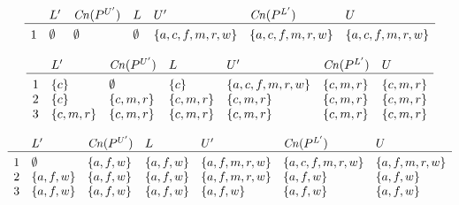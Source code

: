 \documentclass{article}
\begin{document}
\[
\begin{array}{c@{\hspace{10pt}}llllll}
& L' & \mathit{Cn}(P^{U'}) & L
& U' & \mathit{Cn}(P^{L'}) & U \\\hline\\[-3mm]
1 & \emptyset & \emptyset & \emptyset & \{a,c,f,m,r,w\} & \{a,c,f,m,r,w\} & \{a,c,f,m,r,w\} \\ 
\end{array}
\]

\[
\begin{array}{c@{\hspace{10pt}}llllll}
& L' & \mathit{Cn}(P^{U'}) & L
& U' & \mathit{Cn}(P^{L'}) & U \\\hline\\[-3mm]
1 & \{c\} & \emptyset & \{c\} & \{a,c,f,m,r,w\} & \{c,m,r\} & \{c,m,r\} \\ 
2 & \{c\} & \{c,m,r\} & \{c,m,r\} & \{c,m,r\} & \{c,m,r\} & \{c,m,r\} \\ 
3 & \{c,m,r\} & \{c,m,r\} & \{c,m,r\} & \{c,m,r\} & \{c,m,r\} & \{c,m,r\} \\ 
\end{array}
\]

\[
\begin{array}{c@{\hspace{10pt}}llllll}
& L' & \mathit{Cn}(P^{U'}) & L
& U' & \mathit{Cn}(P^{L'}) & U \\\hline\\[-3mm]
1 & \emptyset & \{a,f,w\} & \{a,f,w\} & \{a,f,m,r,w\} & \{a,c,f,m,r,w\} & \{a,f,m,r,w\} \\ 
2 & \{a,f,w\} & \{a,f,w\} & \{a,f,w\} & \{a,f,m,r,w\} & \{a,f,w\} & \{a,f,w\} \\ 
3 & \{a,f,w\} & \{a,f,w\} & \{a,f,w\} & \{a,f,w\} & \{a,f,w\} & \{a,f,w\} \\ 
\end{array}
\]
\end{document}
